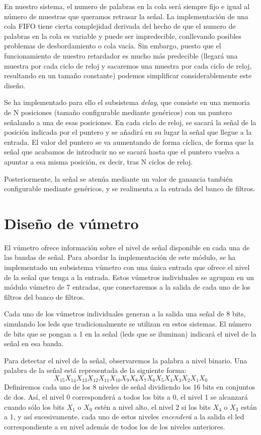 \documentclass[a4paper,12pt]{article}
\begin{document}
En nuestro sistema, el numero de palabras en la cola será siempre fijo e igual al número de muestras que queramos retrasar la señal. La implementación de una cola FIFO tiene cierta complejidad derivada del hecho de que el numero de palabras en la cola es variable y puede ser impredecible, conllevando posibles problemas de desbordamiento o cola vacía. Sin embargo, puesto que el funcionamiento de nuestro retardador es mucho más predecible (llegará una muestra por cada ciclo de reloj y sacaremos una muestra por cada ciclo de reloj, resultando en un tamaño constante) podemos simplificar considerablemente este diseño.

Se ha implementado para ello el subsistema \emph{delay}, que consiste en una memoria de N posiciones (tamaño configurable mediante genéricos) con un puntero señalando a una de esas posiciones. En cada ciclo de reloj, se sacará la señal de la posición indicada por el puntero y se añadirá en su lugar la señal que llegue a la entrada. El valor del puntero se va aumentando de forma cíclica, de forma que la señal que acabamos de introducir no se sacará hasta que el puntero vuelva a apuntar a esa misma posición, es decir, tras N ciclos de reloj.

Posteriormente, la señal se atenúa mediante un valor de ganancia también configurable mediante genéricos, y se realimenta a la entrada del banco de filtros.

\section{Diseño de vúmetro}
El vúmetro ofrece información sobre el nivel de señal disponible en cada una de las bandas de señal. Para abordar la implementación de este módulo, se ha implementado un subsistema vúmetro con una única entrada que ofrece el nivel de la señal que tenga a la entrada. Estos vúmetros individuales se agrupan en un módulo vúmetro de 7 entradas, que conectaremos a la salida de cada uno de los filtros del banco de filtros.

Cada uno de los vúmetros individuales generan a la salida una señal de 8 bits, simulando los leds que tradicionalmente se utilizan en estos sistemas. El número de bits que se pongan a 1 en la señal (leds que se iluminan) indicará el nivel de la señal en esa banda.

Para detectar el nivel de la señal, observaremos la palabra a nivel binario. Una palabra de la señal está representada de la siguiente forma:
$$X_{15} X_{14} X_{13} X_{12} X_{11} X_{10} X_{9} X_{8} X_{7} X_{6} X_{5} X_{4} X_{3} X_{2} X_{1} X_{0}$$
Definiremos cada uno de los 8 niveles de señal dividiendo los 16 bits en conjuntos de dos. Así, el nivel 0 corresponderá a todos los bits a 0, el nivel 1 se alcanzará cuando sólo los bits $X_1$ o $X_0$ estén a nivel alto, el nivel 2 si los bits $X_4$ o $X_3$ están a 1, y así sucesivamente. cada uno de estos niveles \emph{encenderá} a la salida el led correspondiente a su nivel además de todos los de los niveles anteriores.
\end{document}
